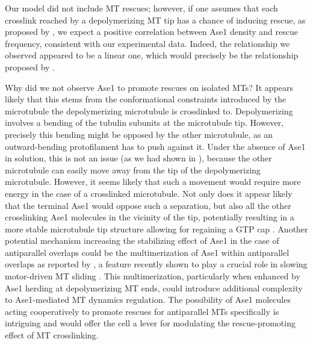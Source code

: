 Our model did not include MT rescues; however, if one assumes that each crosslink reached by a depolymerizing MT tip has a chance of inducing rescue, as proposed by \cite{Stoppin-Mellet2013}, we expect a positive correlation between Ase1 density and rescue frequency, consistent with our experimental data. Indeed, the relationship we observed appeared to be a linear one, which would precisely be the relationship proposed by \cite{Stoppin-Mellet2013}.\par 

Why did we not observe Ase1 to promote rescues on isolated MTs? It appears likely that this stems from the conformational constraints introduced by the microtubule the depolymerizing microtubule is crosslinked to. Depolymerizing involves a bending of the tubulin subunits at the microtubule tip. However, precisely this bending might be opposed by the other microtubule, as an outward-bending protofilament has to push against it. Under the absence of Ase1 in solution, this is not an issue (as we had shown in ), because the other microtubule can easily move away from the tip of the depolymerizing microtubule. However, it seems likely that such a movement would require more energy in the case of a crosslinked microtubule. Not only does it appear likely that the terminal Ase1 would oppose such a separation, but also all the other crosslinking Ase1 molecules in the vicinity of the tip, potentially resulting in a more stable microtubule tip structure allowing for regaining a GTP cap . Another potential mechanism increasing the stabilizing effect of Ase1 in the case of antiparallel overlaps could be the multimerization of Ase1 within antiparallel overlaps as reported by \cite{Kapitein2008}, a feature recently shown to play a crucial role in slowing motor-driven MT sliding \parencite{alfieri2021two}. This multimerization, particularly when enhanced by Ase1 herding at depolymerizing MT ends, could introduce additional complexity to Ase1-mediated MT dynamics regulation. The possibility of Ase1 molecules acting cooperatively to promote rescues for antiparallel MTs specifically is intriguing and would offer the cell a lever for modulating the rescue-promoting effect of MT crosslinking. \par

